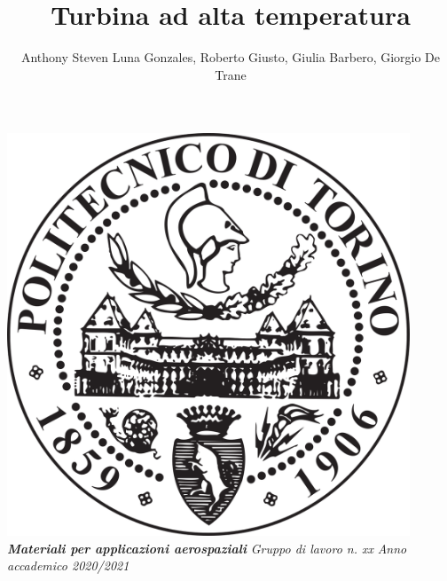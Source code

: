 \documentclass{article}
\author{Anthony Steven Luna Gonzales, Roberto Giusto, Giulia Barbero, Giorgio De Trane}
\title{Turbina ad alta temperatura}
\begin{document}
    \maketitle
    \begin{center}
        \includegraphics[width=0.9\textwidth]{Sources/polito_logo.png}\linebreak\newline
       \textbf{\textit{Materiali per applicazioni aerospaziali}}\linebreak\newline
        \textit{Gruppo di lavoro n. xx}\linebreak\newline
        \textit{Anno accademico 2020/2021}
    \end{center}

    \newpage
\end{document}
